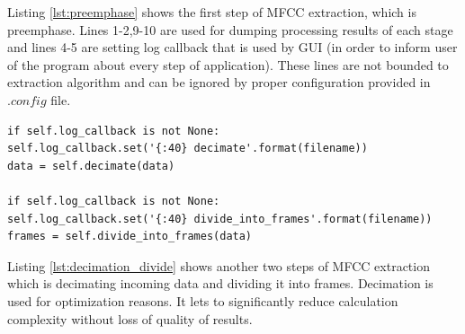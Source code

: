 \documentclass[magister]{dyplom}
\begin{document}
	Listing \ref{lst:preemphase} shows the first step of \gls{MFCC} extraction, which is preemphase. Lines 1-2,9-10 are used for dumping processing results of each stage and lines 4-5 are setting log callback that is used by GUI (in order to inform user of the program about every step of application). These lines are not bounded to extraction algorithm and can be ignored by proper configuration provided in $.config$ file.\\
	
	\begingroup
	\begin{verbatim}
if self.log_callback is not None:
self.log_callback.set('{:40} decimate'.format(filename))
data = self.decimate(data)

if self.log_callback is not None:
self.log_callback.set('{:40} divide_into_frames'.format(filename))
frames = self.divide_into_frames(data)
	\end{verbatim}
	\endgroup
	\vspace{1em}
		
	Listing \ref{lst:decimation_divide} shows another two steps of \gls{MFCC} extraction which is decimating incoming data and dividing it into frames. Decimation is used for optimization reasons. It lets to significantly reduce calculation complexity without loss of quality of results.\\
	
\end{document}

